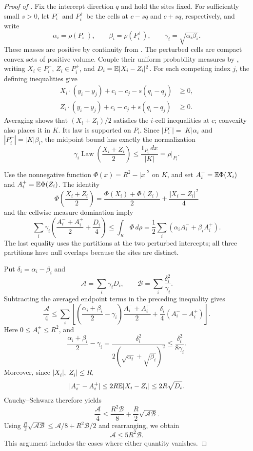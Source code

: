 \begin{proof}[Proof of ]
Fix the intercept direction $q$ and hold the sites fixed.
For sufficiently small $s>0$, let $P_i^-$ and
$P_i^+$ be the cells at $c-sq$ and $c+sq$, respectively, and write
\[
  \alpha_i=\rho(P_i^-),\qquad
  \beta_i=\rho(P_i^+),\qquad
  \gamma_i=\sqrt{\alpha_i\beta_i}.
\]
These masses are positive by continuity from .
The perturbed cells are compact convex sets of positive volume.
Couple their uniform probability measures by ,
writing $X_i\in P_i^-$, $Z_i\in P_i^+$, and
$D_i=\mathbb E|X_i-Z_i|^2$. For each competing index $j$, the defining
inequalities give
\begin{align*}
  X_i\cdot(y_i-y_j)+c_i-c_j-s(q_i-q_j)&\ge0,\\
  Z_i\cdot(y_i-y_j)+c_i-c_j+s(q_i-q_j)&\ge0.
\end{align*}
Averaging shows that $(X_i+Z_i)/2$ satisfies the $i$-cell inequalities
at $c$; convexity also places it in $K$. Its law is supported on $P_i$.
Since $|P_i^-|=|K|\alpha_i$ and $|P_i^+|=|K|\beta_i$, the midpoint
bound has exactly the normalization
\[
  \gamma_i\operatorname{Law}\!\left(\frac{X_i+Z_i}{2}\right)
  \le \frac{1_{P_i}\,dx}{|K|}=\rho|_{P_i}.
\]

Use the nonnegative function $\Phi(x)=R^2-|x|^2$ on $K$, and set
$A_i^-=\mathbb E\Phi(X_i)$ and $A_i^+=\mathbb E\Phi(Z_i)$. The identity
\[
  \Phi\!\left(\frac{X_i+Z_i}{2}\right)
  =\frac{\Phi(X_i)+\Phi(Z_i)}2+\frac{|X_i-Z_i|^2}{4}
\]
and the cellwise measure domination imply
\[
  \sum_i\gamma_i\left(\frac{A_i^-+A_i^+}{2}+\frac{D_i}{4}\right)
  \le\int_K\Phi\,d\rho
  =\frac12\sum_i(\alpha_iA_i^-+\beta_iA_i^+).
\]
The last equality uses the partitions at the two perturbed intercepts;
all three partitions have null overlaps because the sites are distinct.

Put $\delta_i=\alpha_i-\beta_i$ and
\[
  \mathcal A=\sum_i\gamma_iD_i,
  \qquad
  \mathcal B=\sum_i\frac{\delta_i^2}{\gamma_i}.
\]
Subtracting the averaged endpoint terms in the preceding inequality
gives
\[
  \frac{\mathcal A}{4}
  \le\sum_i\left[
    \left(\frac{\alpha_i+\beta_i}{2}-\gamma_i\right)
        \frac{A_i^-+A_i^+}{2}
    +\frac{\delta_i}{4}(A_i^--A_i^+)
  \right].
\]
Here $0\le A_i^\pm\le R^2$, and
\[
  \frac{\alpha_i+\beta_i}{2}-\gamma_i
  =\frac{\delta_i^2}{2(\sqrt{\alpha_i}+\sqrt{\beta_i})^2}
  \le\frac{\delta_i^2}{8\gamma_i}.
\]
Moreover, since $|X_i|,|Z_i|\le R$,
\[
  |A_i^--A_i^+|
  \le 2R\mathbb E|X_i-Z_i|\le2R\sqrt{D_i}.
\]
Cauchy--Schwarz therefore yields
\[
  \frac{\mathcal A}{4}
  \le\frac{R^2\mathcal B}{8}
       +\frac R2\sqrt{\mathcal A\mathcal B}.
\]
Using
$\frac R2\sqrt{\mathcal A\mathcal B}
 \le\mathcal A/8+R^2\mathcal B/2$
and rearranging, we obtain
\[
  \mathcal A\le5R^2\mathcal B.
\]
This argument includes the cases where either quantity vanishes.


\end{proof}
